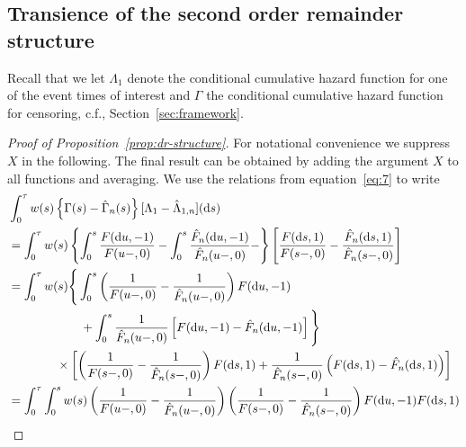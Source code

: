 \subsection{Transience of the second order remainder structure}
\label{sec:state-learner-with}

Recall that we let $\Lambda_1$ denote the conditional cumulative hazard function
for one of the event times of interest and $\Gamma$ the conditional cumulative
hazard function for censoring, c.f., Section~\ref{sec:framework}.

\begin{proof}[Proof of Proposition~\ref{prop:dr-structure}]
  For notational convenience we suppress \( X \) in the following. The final
  result can be obtained by adding the argument \( X \) to all functions and
  averaging. We use the relations from equation~\eqref{eq:7} to write
  \begingroup %
  \allowdisplaybreaks
    \begin{align*}
      & \int_0^{\tau} w(s) 
        \left\{
        \Gamma(s) - \hat{\Gamma}_n(s)
        \right\}
        [\Lambda_1 - \hat{\Lambda}_{1,n}](\diff s)
      \\
      & =
        \int_0^{\tau} w(s) 
        \left\{
        \int_0^s \frac{F(\diff u, -1)}{F(u-, 0)} -
        \int_0^s \frac{\hat{F}_n(\diff u, -1)}{\hat{F}_n(u-, 0)}  -
        \right\}
        \left[
        \frac{F(\diff s, 1)}{F(s-, 0)}
        - \frac{\hat{F}_n(\diff s, 1)}{\hat{F}_n(s-, 0)}
        \right]
      \\
      & =
        \int_0^{\tau} w(s) 
        \Bigg\{
        \int_0^s 
        \left(
        \frac{1}{F(u-, 0)} -  \frac{1}{\hat{F}_n(u-, 0)}
        \right) F(\diff u, -1)
      \\
      & \qquad\qquad \qquad
        +
        \int_0^s \frac{1}{\hat{F}_n(u-, 0)} 
        \left[
        F(\diff u, -1) - \hat{F}_n(\diff u, -1)
        \right]
        \Bigg\}
      \\
      & \qquad\qquad \times
        \left[
        \left(
        \frac{1}{F(s-, 0)} -
        \frac{1}{\hat{F}_n(s-, 0)}
        \right)F(\diff s, 1)
        + \frac{1}{\hat{F}_n(s-, 0)}
        \left(
        F(\diff s, 1) -
        \hat{F}_n(\diff s, 1)
        \right)
        \right]
      \\
      &
        = \int_0^{\tau} 
        \int_0^s
        w(s) 
        \left(
        \frac{1}{F(u-, 0)} -  \frac{1}{\hat{F}_n(u-, 0)}
        \right) 
        \left(
        \frac{1}{F(s-, 0)} -
        \frac{1}{\hat{F}_n(s-, 0)}
        \right)F(\diff u, -1)F(\diff s, 1)

\end{align*}
\end{proof}
